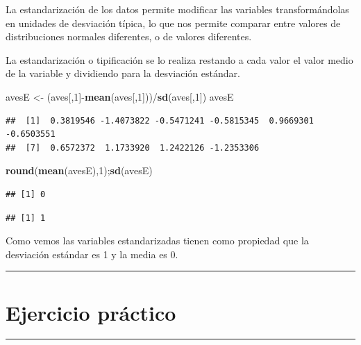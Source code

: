 \documentclass[]{book}
\newenvironment{Shaded}{\begin{snugshade}}{\end{snugshade}}
\newcommand{\KeywordTok}[1]{\textcolor[rgb]{0.13,0.29,0.53}{\textbf{{#1}}}}
\newcommand{\DecValTok}[1]{\textcolor[rgb]{0.00,0.00,0.81}{{#1}}}
\newcommand{\StringTok}[1]{\textcolor[rgb]{0.31,0.60,0.02}{{#1}}}
\newcommand{\NormalTok}[1]{{#1}}
\begin{document}
La estandarización de los datos permite modificar las variables
transformándolas en unidades de desviación típica, lo que nos permite
comparar entre valores de distribuciones normales diferentes, o de
valores diferentes.

La estandarización o tipificación se lo realiza restando a cada valor el
valor medio de la variable y dividiendo para la desviación estándar.

\begin{Shaded}
\begin{Highlighting}[]
\NormalTok{avesE <-}\StringTok{ }\NormalTok{(aves[,}\DecValTok{1}\NormalTok{]-}\KeywordTok{mean}\NormalTok{(aves[,}\DecValTok{1}\NormalTok{]))/}\KeywordTok{sd}\NormalTok{(aves[,}\DecValTok{1}\NormalTok{])}
\NormalTok{avesE}
\end{Highlighting}
\end{Shaded}

\begin{verbatim}
##  [1]  0.3819546 -1.4073822 -0.5471241 -0.5815345  0.9669301 -0.6503551
##  [7]  0.6572372  1.1733920  1.2422126 -1.2353306
\end{verbatim}

\begin{Shaded}
\begin{Highlighting}[]
\KeywordTok{round}\NormalTok{(}\KeywordTok{mean}\NormalTok{(avesE),}\DecValTok{1}\NormalTok{);}\KeywordTok{sd}\NormalTok{(avesE) }
\end{Highlighting}
\end{Shaded}

\begin{verbatim}
## [1] 0
\end{verbatim}

\begin{verbatim}
## [1] 1
\end{verbatim}

Como vemos las variables estandarizadas tienen como propiedad que la
desviación estándar es 1 y la media es 0.

\begin{center}\rule{0.5\linewidth}{\linethickness}\end{center}

\chapter{Ejercicio práctico}\label{ejercicio-practico}

\begin{center}\rule{0.5\linewidth}{\linethickness}\end{center}
\end{document}
